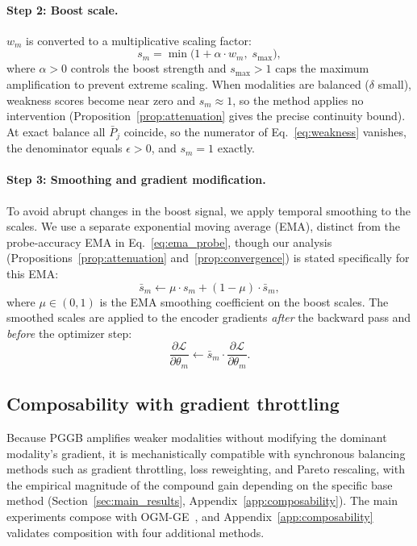 \documentclass{article}
\newcommand{\loss}{\mathcal{L}}
\begin{document}
\paragraph{Step 2: Boost scale.}
$w_m$ is converted to a multiplicative scaling factor:
%
\begin{equation}
\label{eq:boost_scale}
s_m = \min\!\bigl(1 + \alpha \cdot w_m,\; s_{\max}\bigr),
\end{equation}
%
where $\alpha > 0$ controls the boost strength and $s_{\max} > 1$ caps the maximum amplification to prevent extreme scaling. When modalities are balanced ($\delta$ small), weakness scores become near zero and $s_m \approx 1$, so the method applies no intervention (Proposition~\ref{prop:attenuation} gives the precise continuity bound).
At exact balance all $\bar{P}_j$ coincide, so the numerator of Eq.~\eqref{eq:weakness} vanishes, the denominator equals $\epsilon > 0$, and $s_m = 1$ exactly.

\paragraph{Step 3: Smoothing and gradient modification.}
To avoid abrupt changes in the boost signal, we apply temporal smoothing to the scales. We use a separate exponential moving average (EMA), distinct from the probe-accuracy EMA in Eq.~\eqref{eq:ema_probe}, though our analysis (Propositions~\ref{prop:attenuation} and~\ref{prop:convergence}) is stated specifically for this EMA:
%
\begin{equation}
\label{eq:ema_scale}
\bar{s}_m \leftarrow \mu \cdot s_m + (1 - \mu) \cdot \bar{s}_m,
\end{equation}
%
where $\mu \in (0,1)$ is the EMA smoothing coefficient on the boost scales. The smoothed scales are applied to the encoder gradients \emph{after} the backward pass and \emph{before} the optimizer step:
%
\begin{equation}
\label{eq:gradient_mod}
\frac{\partial \loss}{\partial \theta_m} \leftarrow \bar{s}_m \cdot \frac{\partial \loss}{\partial \theta_m}.
\end{equation}
%

\subsection{Composability with gradient throttling}
\label{sec:compose}

Because PGGB amplifies weaker modalities without modifying the dominant modality's gradient, it is mechanistically compatible with synchronous balancing methods such as gradient throttling, loss reweighting, and Pareto rescaling, with the empirical magnitude of the compound gain depending on the specific base method (Section~\ref{sec:main_results}, Appendix~\ref{app:composability}). The main experiments compose with OGM-GE~\citep{peng2022ogmge}, and Appendix~\ref{app:composability} validates composition with four additional methods.
\end{document}
